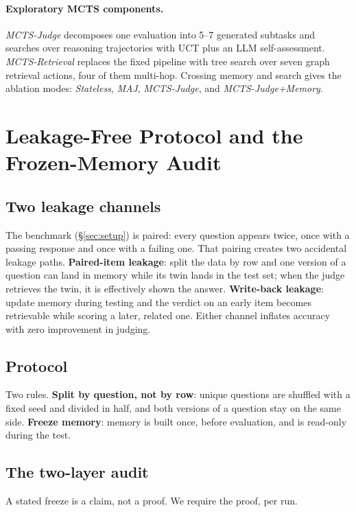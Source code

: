 \documentclass[]{ceurart}
\begin{document}
\paragraph{Exploratory MCTS components.} \emph{MCTS-Judge} decomposes one evaluation into 5--7 generated subtasks and searches over reasoning trajectories with UCT plus an LLM self-assessment. \emph{MCTS-Retrieval} replaces the fixed pipeline with tree search over seven graph retrieval actions, four of them multi-hop. Crossing memory and search gives the ablation modes: \emph{Stateless}, \emph{MAJ}, \emph{MCTS-Judge}, and \emph{MCTS-Judge+Memory}.

\section{Leakage-Free Protocol and the Frozen-Memory Audit}
\label{sec:protocol}

\subsection{Two leakage channels}

The benchmark (\S\ref{sec:setup}) is paired: every question appears twice, once with a passing response and once with a failing one. That pairing creates two accidental leakage paths. \textbf{Paired-item leakage}: split the data by row and one version of a question can land in memory while its twin lands in the test set; when the judge retrieves the twin, it is effectively shown the answer. \textbf{Write-back leakage}: update memory during testing and the verdict on an early item becomes retrievable while scoring a later, related one. Either channel inflates accuracy with zero improvement in judging.

\subsection{Protocol}

Two rules. \textbf{Split by question, not by row}: unique questions are shuffled with a fixed seed and divided in half, and both versions of a question stay on the same side. \textbf{Freeze memory}: memory is built once, before evaluation, and is read-only during the test.

\subsection{The two-layer audit}

A stated freeze is a claim, not a proof. We require the proof, per run.
\end{document}
